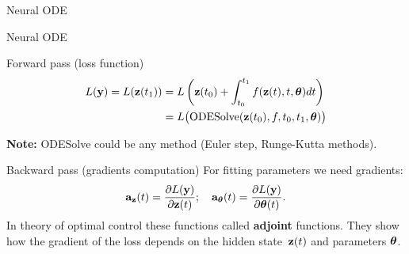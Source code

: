 \begin{frame}{Neural ODE}
\begin{minipage}[t]{0.6\columnwidth}
\begin{figure}
		\end{figure}
	\end{minipage}

\end{frame}

\begin{frame}{Neural ODE}
	\begin{block}{Forward pass (loss function)}
		\vspace{-0.8cm}
		\begin{align*}
			L(\mathbf{y}) = L(\mathbf{z}(t_1)) &= L\left( \mathbf{z}(t_0) + \int_{t_0}^{t_1} f(\mathbf{z}(t), t, \boldsymbol{\theta}) dt \right) \\ &= L\bigl(\text{ODESolve}(\mathbf{z}(t_0), f, t_0,t_1, \boldsymbol{\theta}) \bigr)
		\end{align*}
	\vspace{-0.5cm}
	\end{block}
	\textbf{Note:} ODESolve could be any method (Euler step, Runge-Kutta methods).
	\begin{block}{Backward pass (gradients computation)}
		For fitting parameters we need gradients:
		\[
			\mathbf{a}_{\mathbf{z}}(t) = \frac{\partial L(\mathbf{y})}{\partial \mathbf{z}(t)}; \quad \mathbf{a}_{\boldsymbol{\theta}}(t) = \frac{\partial L(\mathbf{y})}{\partial \boldsymbol{\theta}(t)}.
		\]
		In theory of optimal control these functions called \textbf{adjoint} functions. 
		They show how the gradient of the loss depends on the hidden state~$\mathbf{z}(t)$ and parameters $\boldsymbol{\theta}$.
	\end{block}

\end{frame}
